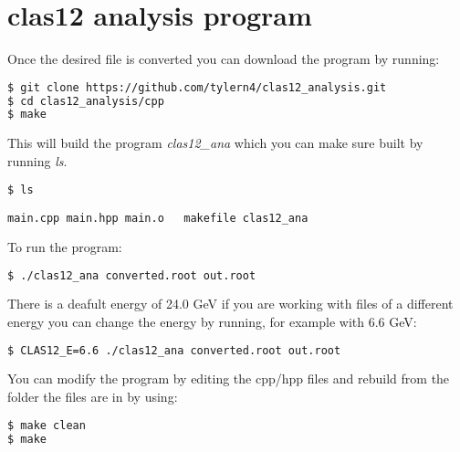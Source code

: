 \documentclass[a4paper]{article}
\begin{document}
\section{clas12 analysis program}
Once the desired file is converted you can download the program by running:

\begin{lstlisting}[language=bash]
$ git clone https://github.com/tylern4/clas12_analysis.git
$ cd clas12_analysis/cpp
$ make
\end{lstlisting}

This will build the program \emph{clas12\_ana} which you can make sure built by running \emph{ls}.

\begin{lstlisting}[language=bash]
$ ls 

main.cpp main.hpp main.o   makefile clas12_ana
\end{lstlisting}

To run the program:
\begin{lstlisting}[language=bash]
$ ./clas12_ana converted.root out.root
\end{lstlisting}

There is a deafult energy of 24.0 GeV if you are working with files of a different energy you can change the energy by running, for example with 6.6 GeV:
\begin{lstlisting}[language=bash]
$ CLAS12_E=6.6 ./clas12_ana converted.root out.root
\end{lstlisting}

You can modify the program by editing the cpp/hpp files and rebuild from the folder the files are in by using:
\begin{lstlisting}[language=bash]
$ make clean
$ make
\end{lstlisting}
\end{document}
